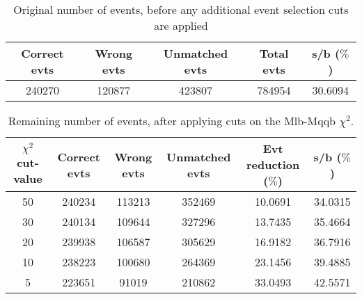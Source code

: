 \documentclass{article}
\begin{document}
 

 \begin{abstract} 
 
   The tables in this document represent the influence of the additional event selection cuts that were applied in order to reduce the number of selected events for CPU reasons. \\ 
   The considered cuts are rather basic and are merely developed to reduce the number of so-called wrong events \\ 
   \begin{itemize} 
     \item Cut on Mlb-Mqqb $\chi^{2}$ distribution \\ 
     \item Cut on top and W-mass window \\ 
   \end{itemize} 
 
   \textbf{Created on :} \today 
 \end{abstract} 
 
 \begin{table}[h!t] 
  \caption{Original number of events, before any additional event selection cuts are applied} 
  \centering 
   \begin{tabular}{c|c|c|c|c} 
     Correct evts    & Wrong evts     & Unmatched evts      &  Total evts & s/b ($\%$)     \\ 
     \hline
     240270   &   120877  & 423807 & 784954  & 30.6094 
 
   \end{tabular} 
 \end{table} 
 
 \begin{table}[h!t] 
  \caption{Remaining number of events, after applying cuts on the Mlb-Mqqb $\chi^{2}$.} 
  \centering 
   \begin{tabular}{c|c|c|c|c|c} 
     $\chi^{2}$ cut-value    & Correct evts    & Wrong evts     & Unmatched evts  & Evt reduction ($\%$)    & s/b ($\%$)     \\ 
     \hline
     50  &   240234  &  113213  &   352469 &  10.0691 & 34.0315 \\ 
     30  &   240134  &  109644  &   327296 &  13.7435 & 35.4664 \\ 
     20  &   239938  &  106587  &   305629 &  16.9182 & 36.7916 \\ 
     10  &   238223  &  100680  &   264369 &  23.1456 & 39.4885 \\ 
     5  &   223651  &  91019  &   210862 &  33.0493 & 42.5571
   \end{tabular} 
 \end{table} 
 
\end{document}
